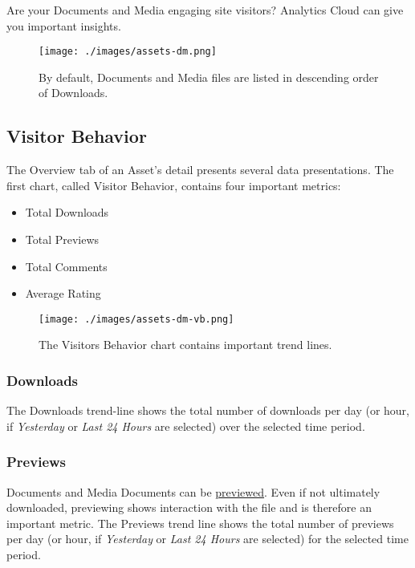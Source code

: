 Are your Documents and Media engaging site visitors? Analytics Cloud can
give you important insights.

\begin{figure}
\centering
\texttt{[image: ./images/assets-dm.png]}
\caption{By default, Documents and Media files are listed in descending
order of Downloads.}
\end{figure}

\subsection{Visitor Behavior}\label{visitor-behavior-3}

The Overview tab of an Asset's detail presents several data
presentations. The first chart, called Visitor Behavior, contains four
important metrics:

\begin{itemize}
\tightlist
\item
  Total Downloads
\item
  Total Previews
\item
  Total Comments
\item
  Average Rating
\end{itemize}

\begin{figure}
\centering
\texttt{[image: ./images/assets-dm-vb.png]}
\caption{The Visitors Behavior chart contains important trend lines.}
\end{figure}

\subsubsection{Downloads}\label{downloads}

The Downloads trend-line shows the total number of downloads per day (or
hour, if \emph{Yesterday} or \emph{Last 24 Hours} are selected) over the
selected time period.

\subsubsection{Previews}\label{previews}

Documents and Media Documents can be
\href{/docs/7-1/user/-/knowledge_base/u/viewing-file-previews}{previewed}.
Even if not ultimately downloaded, previewing shows interaction with the
file and is therefore an important metric. The Previews trend line shows
the total number of previews per day (or hour, if \emph{Yesterday} or
\emph{Last 24 Hours} are selected) for the selected time period.

